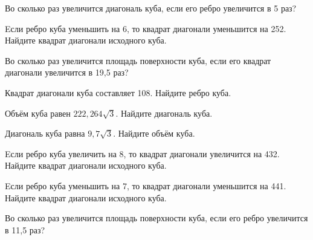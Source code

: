 \begin{taskBN}{10}
Во сколько раз увеличится диагональ куба, если его ребро увеличится в 5 раз?
\end{taskBN}

\begin{taskBN}{11}
Eсли ребро куба уменьшить на 6, то квадрат диагонали уменьшится на 252. Найдите квадрат диагонали исходного куба.
\end{taskBN}

\begin{taskBN}{12}
Во сколько раз увеличится площадь поверхности куба, если его квадрат диагонали увеличится в 19,5 раз?
\end{taskBN}

\begin{taskBN}{13}
Квадрат диагонали куба составляет 108. Найдите ребро куба.
\end{taskBN}

\begin{taskBN}{14}
Объём куба равен $222,264\sqrt{3}$. Найдите диагональ куба.
\end{taskBN}

\begin{taskBN}{15}
Диагональ куба равна $9,7\sqrt{3}$. Найдите объём куба.
\end{taskBN}

\begin{taskBN}{16}
Eсли ребро куба увеличить на 8, то квадрат диагонали увеличится на 432. Найдите квадрат диагонали исходного куба.
\end{taskBN}

\begin{taskBN}{17}
Eсли ребро куба уменьшить на 7, то квадрат диагонали уменьшится на 441. Найдите квадрат диагонали исходного куба.
\end{taskBN}

\begin{taskBN}{18}
Во сколько раз увеличится площадь поверхности куба, если его ребро увеличится в 11,5 раз?
\end{taskBN}

